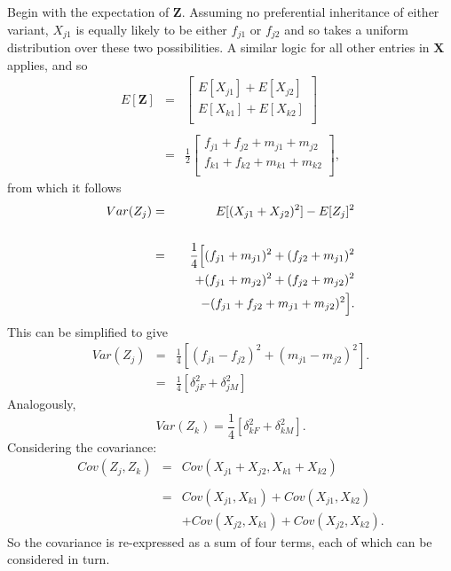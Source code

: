 \documentclass[sts]{imsart}
\newcommand{\ve}[1]{\mathbf{#1}}           %
\newcommand{\m}[1]{\mathbf{#1}}               %
\begin{document}
Begin with the expectation of $\ve{Z}$. Assuming no preferential inheritance of either variant, $X_{j1}$ is equally likely to be either $f_{j1}$ or $f_{j2}$ and so takes a uniform distribution over these two possibilities. A similar logic for all other entries in $\m{X}$ applies, and so
\begin{eqnarray}
    E[\ve{Z}] & = & {\begin{bmatrix}
        E[X_{j1}] + E[X_{j2}] \\
        E[X_{k1}] + E[X_{k2}] \\
      \end{bmatrix}} \nonumber\\
    & & \nonumber\\
    & = & {\frac{1}{2}\begin{bmatrix}
        f_{j1} + f_{j2} + m_{j1} + m_{j2} \\
        f_{k1} + f_{k2} + m_{k1} + m_{k2} \\
      \end{bmatrix}}, \nonumber
\end{eqnarray}
from which it follows
\begin{eqnarray}
    Var(Z_j) & = & E[(X_{j1} + X_{j2})^2] - E[Z_j]^2 \nonumber\\
    & & \nonumber\\ 
    & = & \frac{1}{4} \Big[ (f_{j1} + m_{j1})^2 + (f_{j2} + m_{j1})^2 \nonumber\\
    & & \hspace{0.5cm} + (f_{j1} + m_{j2})^2 + (f_{j2} + m_{j2})^2  \nonumber\\
    & & \hspace{0.5cm}  - (f_{j1} + f_{j2} + m_{j1} + m_{j2})^2 \Big]. \nonumber
\end{eqnarray}
This can be simplified to give
\begin{eqnarray} 
  Var(Z_j) & = & \frac{1}{4} \left [ (f_{j1} - f_{j2})^2 + (m_{j1} - m_{j2})^2 \right ]. \nonumber \\
  & = & \frac{1}{4} \left [ \delta_{jF}^2 + \delta_{jM}^2 \right ] \label{eq:z1var}
\end{eqnarray}
Analogously,
\begin{equation} \label{eq:z2var}
  Var(Z_k) = \frac{1}{4} \left [ \delta_{kF}^2 + \delta_{kM}^2 \right ].
\end{equation}
Considering the covariance:
\begin{eqnarray} 
    Cov(Z_j, Z_k) & = & Cov(X_{j1} + X_{j2}, X_{k1} + X_{k2}) \nonumber\\
    & & \nonumber \\
    & = & Cov(X_{j1}, X_{k1}) + Cov(X_{j1}, X_{k2}) \label{eq:covstep1} \\
    & &  + Cov(X_{j2}, X_{k1}) + Cov(X_{j2}, X_{k2}). \nonumber
\end{eqnarray}
So the covariance is re-expressed as a sum of four terms, each of which can be considered in turn.
\end{document}
